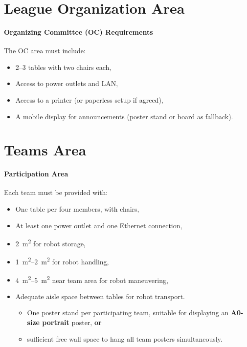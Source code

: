 \section{League Organization Area}

\paragraph{Organizing Committee (OC) Requirements}
The OC area must include:  
\begin{itemize}
    \item \numrange{2}{3} tables with two chairs each,
    \item Access to power outlets and LAN,
    \item Access to a printer (or paperless setup if agreed),
    \item A mobile display for announcements (poster stand or board as fallback).
\end{itemize}

\section{Teams Area}

\paragraph{Participation Area}
Each team must be provided with:
\begin{itemize}
    \item One table per four members, with chairs,
    \item At least one power outlet and one Ethernet connection,
    \item \qty{2}{\metre\squared} for robot storage,
    \item \qtyrange{1}{2}{\metre\squared} for robot handling,
    \item \qtyrange{4}{5}{\metre\squared} near team area for robot maneuvering,
    \item Adequate aisle space between tables for robot transport.
     \begin{itemize}
        \item One poster stand per participating team, suitable for displaying an \textbf{A0-size portrait} poster, \textbf{or}
        \item sufficient free wall space to hang all team posters simultaneously.
    \end{itemize}
\end{itemize}

